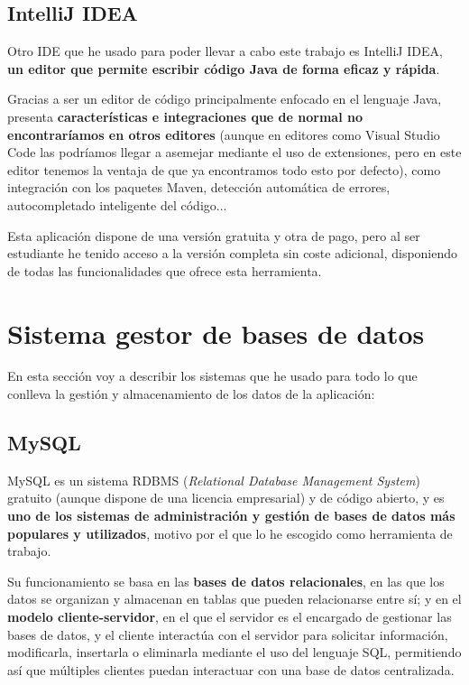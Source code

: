\subsection{IntelliJ IDEA}

Otro IDE que he usado para poder llevar a cabo este trabajo es IntelliJ IDEA, \textbf{un editor que permite escribir código Java de forma eficaz y rápida}. 

Gracias a ser un editor de código principalmente enfocado en el lenguaje Java, presenta \textbf{características e integraciones que de normal no encontraríamos en otros editores} (aunque en editores como Visual Studio Code las podríamos llegar a asemejar mediante el uso de extensiones, pero en este editor tenemos la ventaja de que ya encontramos todo esto por defecto), como integración con los paquetes Maven, detección automática de errores, autocompletado inteligente del código... \cite{jetbrains:idea}

Esta aplicación dispone de una versión gratuita y otra de pago, pero al ser estudiante he tenido acceso a la versión completa sin coste adicional, disponiendo de todas las funcionalidades que ofrece esta herramienta. \cite{jetbrains:students}

\section{Sistema gestor de bases de datos}

En esta sección voy a describir los sistemas que he usado para todo lo que conlleva la gestión y almacenamiento de los datos de la aplicación:

\subsection{MySQL}

MySQL es un sistema RDBMS (\textit{Relational Database Management System}) gratuito (aunque dispone de una licencia empresarial) y de código abierto, y es \textbf{uno de los sistemas de administración y gestión de bases de datos más populares y utilizados}, motivo por el que lo he escogido como herramienta de trabajo.

Su funcionamiento se basa en las \textbf{bases de datos relacionales}, en las que los datos se organizan y almacenan en tablas que pueden relacionarse entre sí; y en el \textbf{modelo cliente-servidor}, en el que el servidor es el encargado de gestionar las bases de datos, y el cliente interactúa con el servidor para solicitar información, modificarla, insertarla o eliminarla mediante el uso del lenguaje SQL, permitiendo así que múltiples clientes puedan interactuar con una base de datos centralizada. \cite{wikipedia:mysql}


